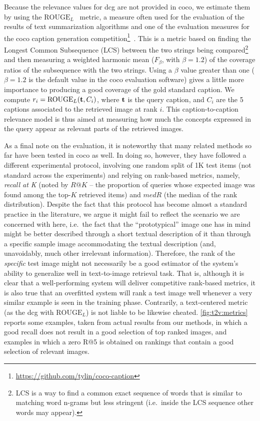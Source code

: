 Because the relevance values for \gls{dcg} are not provided in \gls{coco}, we estimate them by using the $\text{ROUGE}_L$~\cite{lin2004rouge} metric, a measure often used for the evaluation of the results of text summarization algorithms and one of the evaluation measures for the \gls{coco} caption generation competition\footnote{\url{https://github.com/tylin/coco-caption}}~\cite{chen2015microsoft}.
This is a metric based on finding the Longest Common Subsequence (LCS) between the two strings being compared\footnote{LCS is a way to find a common exact sequence of words that is similar to matching word n-grams but less stringent (i.e.\ inside the LCS sequence other words may appear).} and then measuring a weighted harmonic mean ($F_\beta$, with $\beta=1.2$) of the coverage ratios of the subsequence with the two strings.
Using a $\beta$ value greater than one ($\beta=1.2$ is the default value in the \gls{coco} evaluation software) gives a little more importance to producing a good coverage of the gold standard caption.
We compute $r_i = \text{ROUGE}_L ( \mathbf{t}, C_i ) $, where $\mathbf{t}$ is the query caption, and $C_i$ are the 5 captions associated to the retrieved image at rank $i$.
This caption-to-caption relevance model is thus aimed at measuring how much the concepts expressed in the query appear as relevant parts of the retrieved images.

As a final note on the evaluation, it is noteworthy that many related methods so far \cite{mao2014deep,ma2015multimodal,klein2014fisher,karpathy2015deep,donahue2015long,kiros2015skip,wang2016learning} have been tested in \gls{coco} as well.
In doing so, however, they have followed a different experimental protocol, involving one random split of 1K test items (not standard across the experiments) and relying on rank-based metrics, namely, \emph{recall at K} (noted by $R@K$ -- the proportion of queries whose expected image was found among the top-$K$ retrieved items) and $medR$ (the median of the rank distribution).
Despite the fact that this protocol has become almost a standard practice in the literature, we argue it might fail to reflect the scenario we are concerned with here, i.e.\ the fact that the ``prototypical'' image one has in mind might be better described through a short textual description of it than through a specific sample image accommodating the textual description (and, unavoidably, much other irrelevant information).
Therefore, the rank of the \emph{specific} test image might not necessarily be a good estimator of the system's ability to generalize well in text-to-image retrieval task.
That is, although it is clear that a well-performing system will deliver competitive rank-based metrics, it is also true that an overfitted system will rank a test image well whenever a very similar example is seen in the training phase.
Contrarily, a text-centered metric (as the \gls{dcg} with $\text{ROUGE}_L$) is not liable to be likewise cheated.
\ref{fig:t2v:metrics} reports some examples, taken from actual results from our methods, in which a good recall does not result in a good selection of top ranked images, and examples in which a zero R@5 is obtained on rankings that contain a good selection of relevant images.

